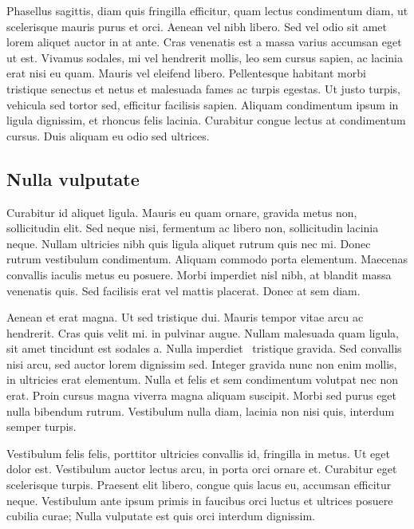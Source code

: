 Phasellus sagittis, diam quis fringilla efficitur, quam lectus condimentum diam, ut scelerisque mauris purus et orci. Aenean vel nibh libero. Sed vel odio sit amet lorem aliquet auctor in at ante. Cras venenatis est a massa varius accumsan eget ut est. Vivamus sodales, mi vel hendrerit mollis, leo sem cursus sapien, ac lacinia erat nisi eu quam. Mauris vel eleifend libero. Pellentesque habitant morbi tristique senectus et netus et malesuada fames ac turpis egestas. Ut justo turpis, vehicula sed tortor sed, efficitur facilisis sapien. Aliquam condimentum ipsum in ligula dignissim, et rhoncus felis lacinia. Curabitur congue lectus at condimentum cursus. Duis aliquam eu odio sed ultrices.

\subsection{Nulla vulputate}

Curabitur id aliquet ligula. Mauris eu quam ornare, gravida metus non, sollicitudin elit. Sed neque nisi, fermentum ac libero non, sollicitudin lacinia neque. Nullam ultricies nibh quis ligula aliquet rutrum quis nec mi. Donec rutrum vestibulum condimentum. Aliquam commodo porta elementum. Maecenas convallis iaculis metus eu posuere. Morbi imperdiet nisl nibh, at blandit massa venenatis quis. Sed facilisis erat vel mattis placerat. Donec at sem diam.

Aenean et erat magna. Ut sed tristique dui. Mauris tempor  vitae arcu ac hendrerit. Cras quis velit mi. \textcite{abreu2020autoformacao} in pulvinar augue. Nullam malesuada quam ligula, sit amet tincidunt est sodales a. Nulla imperdiet \textregistered\ tristique gravida. Sed convallis nisi arcu, sed auctor lorem dignissim sed. Integer gravida nunc non enim mollis, in ultricies erat elementum. Nulla et felis et sem condimentum volutpat nec non erat. Proin cursus magna viverra magna aliquam suscipit. Morbi sed purus eget nulla bibendum rutrum. Vestibulum nulla diam, lacinia non nisi quis, interdum semper turpis.

Vestibulum felis felis, porttitor ultricies convallis id, fringilla in metus. Ut eget dolor est. Vestibulum auctor lectus arcu, in porta orci ornare et. Curabitur eget scelerisque turpis. Praesent elit libero, congue quis lacus eu, accumsan efficitur neque. Vestibulum ante ipsum primis in faucibus orci luctus et ultrices posuere cubilia curae; Nulla vulputate est quis orci interdum dignissim.

